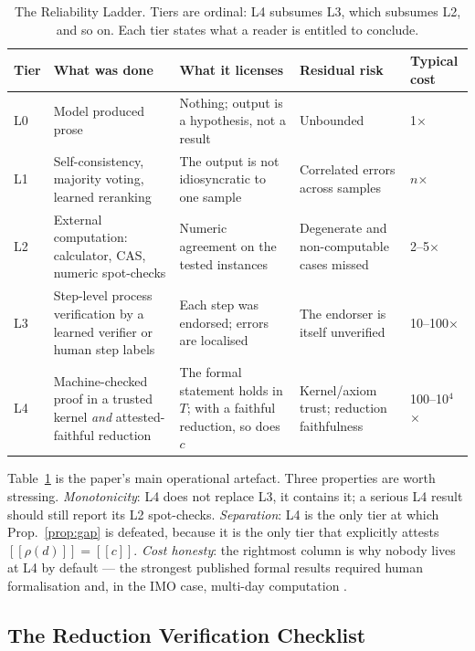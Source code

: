 \documentclass[11pt,a4paper]{article}
\theoremstyle{plain}
\theoremstyle{remark}
\newcommand{\red}{\rho}                 %
\newcommand{\sem}[1]{\ensuremath{[\![#1]\!]}}   %
\begin{document}
\begin{table}[t]
\caption{The Reliability Ladder.  Tiers are ordinal: L4 subsumes L3, which
  subsumes L2, and so on.  Each tier states what a reader is entitled to
  conclude.}
\label{tab:ladder}
\centering\small
\begin{tabular}{@{}p{0.7cm}p{2.6cm}p{4.6cm}p{2.2cm}p{2.1cm}@{}}
\toprule
\textbf{Tier} & \textbf{What was done} & \textbf{What it licenses} & \textbf{Residual risk} & \textbf{Typical cost}\\
\midrule
L0 & Model produced prose & Nothing; output is a hypothesis, not a result & Unbounded & 1$\times$ \\
L1 & Self-consistency, majority voting, learned reranking \cite{cobbe2021gsm8k}
    & The output is not idiosyncratic to one sample & Correlated errors across samples & $n$$\times$ \\
L2 & External computation: calculator, CAS, numeric spot-checks \cite{schick2023toolformer,chen2022pot}
    & Numeric agreement on the tested instances & Degenerate and non-computable cases missed & 2--5$\times$ \\
L3 & Step-level process verification by a learned verifier or human step labels \cite{uesato2022process,lightman2023letsverify}
    & Each step was endorsed; errors are localised & The endorser is itself unverified & 10--100$\times$ \\
L4 & Machine-checked proof in a trusted kernel \emph{and} attested-faithful reduction \cite{moura2021lean4,hubert2025alphaproof}
    & The formal statement holds in $T$; with a faithful reduction, so does $c$ & Kernel/axiom trust; reduction faithfulness & 100--10$^4$$\times$ \\
\bottomrule
\end{tabular}
\end{table}

Table~\ref{tab:ladder} is the paper's main operational artefact.  Three
properties are worth stressing.  \emph{Monotonicity}: L4 does not replace L3,
it contains it; a serious L4 result should still report its L2 spot-checks.
\emph{Separation}: L4 is the only tier at which Prop.~\ref{prop:gap} is
defeated, because it is the only tier that explicitly attests $\sem{\red(d)}=\sem{c}$.
\emph{Cost honesty}: the rightmost column is why nobody lives at L4 by default
--- the strongest published formal results required human formalisation and, in
the IMO case, multi-day computation \cite{hubert2025alphaproof}.

\subsection{The Reduction Verification Checklist}
\end{document}
